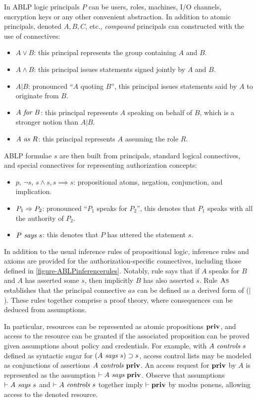 In ABLP logic principals $P$ can be users, roles, machines, I/O channels,
encryption keys or any other convenient abstraction. In addition to atomic
principals, denoted $A,B,C$, etc., \emph{compound} principals can
constructed with the use of connectives:
\begin{itemize}
\item $A \vee B$: this principal represents the group containing $A$ and $B$.
\item  $A \wedge B$: this principal issues statements signed jointly by 
$A$ and $B$.
\item $A|B$: pronounced ``$A$ quoting $B$'', this principal issues statements
said by $A$ to originate from $B$.
\item $A \textit{ for } B$: this principal represents $A$ speaking on behalf of 
$B$, which is a stronger notion than $A|B$.
\item $A \textit{ as } R$: this principal represents $A$ assuming the role 
$R$.
\end{itemize}
ABLP formulae $s$ are then built from principals, standard logical
connectives, and special connectives for representing authorization
concepts:
\begin{itemize}
\item $p$, $\neg s$, $s \wedge s, s \implies s$: 
propositional atoms, negation, conjunction, and implication.
\item $P_1 \Rightarrow P_2$: pronounced ``$P_1$ speaks for $P_2$'', this denotes that
$P_1$ speaks with all the authority of $P_2$.
\item $P \textit{ says } s$: this denotes that $P$ has uttered the statement $s$.
\end{itemize}

In addition to the usual inference rules of propositional logic,
inference rules and axioms are provided for the authorization-specific
connectives, including those defined in
\autoref{figure-ABLPinferencerules}.  Notably, rule
 says that if $A$ speaks for $B$ and $A$ has
asserted some $s$, then implicitly $B$ has also asserted $s$.  Rule
$\text{\sc As}$ establishes that the principal connective $\mathit{as}$ can be defined as
a derived form of ($|$). These rules together comprise a proof theory,
where consequences can be deduced from assumptions.

In particular, resources can be represented as atomic propositions
$\mathbf{priv}$, and access to the resource can be granted if the associated
proposition can be proved given assumptions about policy and
credentials.  For example, with $A
\textit{ controls } s$ defined as syntactic sugar for $(A \textit{ says } s) \supset s$,
access control lists may be modeled as conjunctions of assertions $A
\textit{ controls } \mathbf{priv}$.  An access request for $\mathbf{priv}$ by $A$ is represented
as the assumption $\vdash A \textit{ says } \mathbf{priv}$.  Observe that assumptions
$\vdash A \textit{ says } s$ and $\vdash A \textit{ controls } s$ together imply $\vdash
\mathbf{priv}$ by modus ponens, allowing access to the denoted resource.

